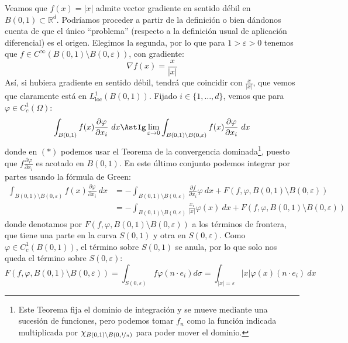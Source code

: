 \begin{ejemplo}
    Veamos que $f(x)=|x|$ admite vector gradiente en sentido débil en $B(0,1)\subset \mathbb{R}^d$. Podríamos proceder a partir de la definición o bien dándonos cuenta de que el único ``problema'' (respecto a la definición usual de aplicación diferencial) es el origen. Elegimos la segunda, por lo que para $1>\varepsilon>0$ tenemos que $f\in C^\infty(B(0,1)\setminus B(0,\varepsilon))$, con gradiente:
    \begin{equation*}
        \nabla f(x) = \frac{x}{|x|}
    \end{equation*}
    Así, si hubiera gradiente en sentido débil, tendrá que coincidir con $\frac{x}{|x|}$, que vemos que claramente está en $L^1_{\text{loc}}(B(0,1))$. Fijado $i \in \{1,\ldots,d\}$, vemos que para $\varphi \in C^1_c(\Omega)$:
    \begin{equation*}
        \int_{B(0,1)}f(x)\frac{\partial \varphi}{\partial x_i}~dx \AstIg \lim_{\varepsilon\to0} \int_{B(0,1)\setminus B(0,\varepsilon)} f(x)\frac{\partial \varphi}{\partial x_i}~dx
    \end{equation*}
    donde en $(\ast)$ podemos usar el Teorema de la convergencia dominada\footnote{Este Teorema fija el dominio de integración y se mueve mediante una sucesión de funciones, pero podemos tomar $f_n$ como la función indicada multiplicada por $\chi_{B(0,1)\setminus B(0,\nicefrac{1}{n})}$ para poder mover el dominio.}, puesto que $f\frac{\partial \varphi}{\partial x_i}$ es acotado en $B(0,1)$. En este último conjunto podemos integrar por partes usando la fórmula de Green:
    \begin{align*}
        \int_{B(0,1)\setminus  B(0,\varepsilon)}f(x)\frac{\partial \varphi}{\partial x_i}~dx &= -\int_{B(0,1)\setminus B(0,\varepsilon)} \frac{\partial f}{\partial x_i}\varphi~dx + F(f,\varphi,B(0,1)\setminus B(0,\varepsilon)) \\
                                                                                             &= -\int_{B(0,1)\setminus B(0,\varepsilon)} \frac{x_i}{|x|}\varphi(x)~dx+ F(f,\varphi,B(0,1)\setminus B(0,\varepsilon)) 
    \end{align*}
    donde denotamos por $F(f,\varphi,B(0,1)\setminus B(0,\varepsilon))$ a los términos de frontera, que tiene una parte en la curva $S(0,1)$ y otra en $S(0,\varepsilon)$. Como $\varphi \in C_c^1(B(0,1))$, el término sobre $S(0,1)$ se anula, por lo que solo nos queda el término sobre $S(0,\varepsilon)$:
    \begin{equation*}
        F(f,\varphi,B(0,1)\setminus B(0,\varepsilon)) = \int_{S(0,\varepsilon)} f\varphi (n\cdot e_i) d\sigma = \int_{|x|=\varepsilon}|x|\varphi(x)(n\cdot e_i)~dx

\end{equation*}
\end{ejemplo}
